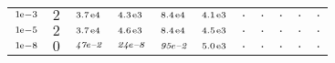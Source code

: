 \begin{tiny}
\begin{tabular}{@{$\;$}c@{$\;$}|@{$\;$}c@{$\;$}@{$\;$}c@{$\;$}@{$\;$}c@{$\;$}@{$\;$}c@{$\;$}@{$\;$}c@{$\;$}|@{$\;$}c@{$\;$}@{$\;$}c@{$\;$}@{$\;$}c@{$\;$}@{$\;$}c@{$\;$}@{$\;$}c@{$\;$}}
$\scriptstyle1\!\mathrm{\hspace{0.10em}e}-3$ & $\scriptstyle2$ & $\scriptstyle3.7\mathrm{\hspace{0.10em}e}4$ & $\scriptstyle4.3\mathrm{\hspace{0.10em}e}3$ & $\scriptstyle8.4\mathrm{\hspace{0.10em}e}4$ & $\scriptstyle4.1\mathrm{\hspace{0.10em}e}3$ & $\scriptstyle.$ & $\scriptstyle.$ & $\scriptstyle.$ & $\scriptstyle.$ & $\scriptstyle.$\\ 
$\scriptstyle1\!\mathrm{\hspace{0.10em}e}-5$ & $\scriptstyle2$ & $\scriptstyle3.7\mathrm{\hspace{0.10em}e}4$ & $\scriptstyle4.6\mathrm{\hspace{0.10em}e}3$ & $\scriptstyle8.4\mathrm{\hspace{0.10em}e}4$ & $\scriptstyle4.5\mathrm{\hspace{0.10em}e}3$ & $\scriptstyle.$ & $\scriptstyle.$ & $\scriptstyle.$ & $\scriptstyle.$ & $\scriptstyle.$\\ 
$\scriptstyle1\!\mathrm{\hspace{0.10em}e}-8$ & $\scriptstyle0$ & $\scriptstyle\textit{47}\hspace{0.00em}e\textit{--2}$ & $\scriptstyle\textit{24}\hspace{0.00em}e\textit{--8}$ & $\scriptstyle\textit{95}\hspace{0.00em}e\textit{--2}$ & $\scriptstyle5.0\mathrm{\hspace{0.10em}e}3$ & $\scriptstyle.$ & $\scriptstyle.$ & $\scriptstyle.$ & $\scriptstyle.$ & $\scriptstyle.$\\ 
\end{tabular} 
\end{tiny} 
